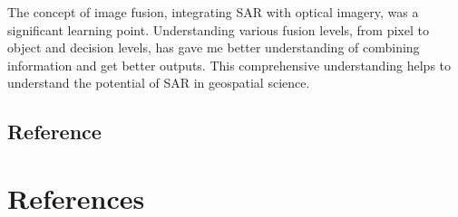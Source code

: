 \documentclass[
  letterpaper,
  DIV=11,
  numbers=noendperiod]{scrreprt}
\begin{document}
The concept of image fusion, integrating SAR with optical imagery, was a
significant learning point. Understanding various fusion levels, from
pixel to object and decision levels, has gave me better understanding of
combining information and get better outputs. This comprehensive
understanding helps to understand the potential of SAR in geospatial
science.

\section{\texorpdfstring{\textbf{Reference}}{Reference}}\label{reference-2}


\chapter*{References}\label{references-1}

\end{document}
